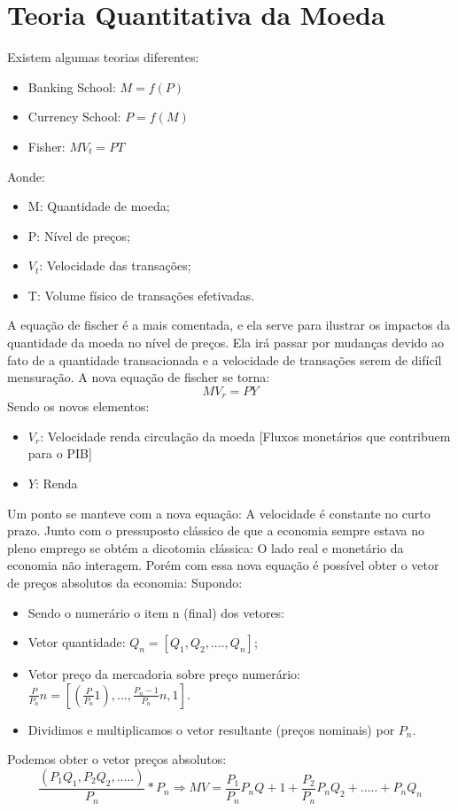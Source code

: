 \documentclass[12pt,a4paper,oneside,brazil]{abntex2}
\begin{document}
\section{Teoria Quantitativa da Moeda}
Existem algumas teorias diferentes:
\begin{itemize}
\item Banking School: $ M = f(P) $
\item Currency School: $ P = f(M) $
\item Fisher: $ M V_t = P T $
\end{itemize}
Aonde:
\begin{itemize}
\item M: Quantidade de moeda;
\item P: Nível de preços;
\item $V_t$: Velocidade das transações;
\item T: Volume físico de transações efetivadas.
\end{itemize}
A equação de fischer é a mais comentada, e ela serve para ilustrar os impactos da quantidade da moeda no nível de preços. Ela irá passar por mudanças devido ao fato de a quantidade transacionada e a velocidade de transações serem de difícíl mensuração. A nova equação de fischer se torna:
\[ M V_r = P Y\] 
Sendo os novos elementos:
\begin{itemize}
\item $ V_r$: Velocidade renda circulação da moeda [Fluxos monetários que contribuem para o PIB]
\item $Y$: Renda
\end{itemize}
Um ponto se manteve com a nova equação: A velocidade é constante no curto prazo. Junto com o pressuposto clássico de que a economia sempre estava no pleno emprego se obtém a dicotomia clássica: O lado real e monetário da economia não interagem.  Porém com essa nova equação é possível obter o vetor de preços absolutos da economia: \newline
Supondo:
\begin{itemize}
\item Sendo o numerário o item n (final) dos vetores:
\item Vetor quantidade: $Q_n  = [Q_1,Q_2, ...., Q_n]$;
\item Vetor preço da mercadoria sobre preço numerário: $\frac{P}{P_n}n =[(\frac{P}{P_n}1), ..., \frac{P_n-1}{P_n}n, 1]$.
\item Dividimos e multiplicamos o vetor resultante (preços nominais) por $P_n$.
\end{itemize}
Podemos obter o vetor preços absolutos:
\[ \frac{(P_1 Q_1, P_2 Q_2,.....)}{P_n}*P_n \Rightarrow M V = \frac{P_1}{P_n} P_n Q+1 + \frac{P_2}{P_n} P_n Q_2  + ..... + P_n Q_n\]
\end{document}
